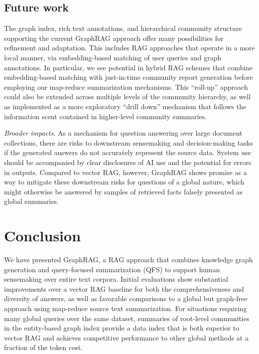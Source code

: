 \documentclass{article}
\begin{document}
\subsection{Future work}
The graph index, rich text annotations, and hierarchical community structure supporting the current GraphRAG approach offer many possibilities for refinement and adaptation.
This includes RAG approaches that operate in a more local manner, via embedding-based matching of user queries and graph annotations.
In particular, we see potential in hybrid RAG schemes that combine embedding-based matching with just-in-time community report generation before employing our map-reduce summarization mechanisms.
This ``roll-up'' approach could also be extended across multiple levels of the community hierarchy, as well as implemented as a more exploratory ``drill down'' mechanism that follows the information scent contained in higher-level community summaries.

\emph{Broader impacts}. As a mechanism for question answering over large document collections, there are risks to downstream sensemaking and decision-making tasks if the generated answers do not accurately represent the source data.
System use should be accompanied by clear disclosures of AI use and the potential for errors in outputs.
Compared to vector RAG, however, GraphRAG shows promise as a way to mitigate these downstream risks for questions of a global nature, which might otherwise be answered by samples of retrieved facts falsely presented as global summaries.

\section{Conclusion}

We have presented GraphRAG, a RAG approach that combines knowledge graph generation and query-focused summarization (QFS) to support human sensemaking over entire text corpora.
Initial evaluations show substantial improvements over a vector RAG baseline for both the comprehensiveness and diversity of answers, as well as favorable comparisons to a global but graph-free approach using map-reduce source text summarization. 
For situations requiring many global queries over the same dataset, summaries of root-level communities in the entity-based graph index provide a data index that is both superior to vector RAG and achieves competitive performance to other global methods at a fraction of the token cost.


\end{document}
